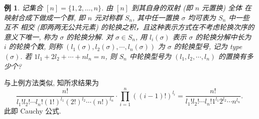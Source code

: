 \documentclass[13pt, punct]{ctexbeamer}
\def\sol{\noindent {\bf 解\ }}
\newtheorem{ex}{例}[section]
\begin{document}
\begin{frame}
	\begin{ex}
		记集合 $[n]=\{1,2, \ldots, n\}$. 由 $[n]$ 到其自身的双射 (即 $n$ 元置换) 全体 在映射合成下做成一个群, 即 $n$ 元对称群 $S_n$, 其中任一置换 $\sigma$ 均可表为 $S_n$ 中一些互不 相交 (即两两无公共元素) 的轮换之积，且这种表示方式在不考虑轮换次序的意义下唯一, 称为 $\sigma$ 的轮换分解. 对 $\sigma \in S_n$, 用 $l_i(\sigma)$ 表示 $\sigma$ 的轮换分解中长为 $i$ 的轮换个数, 则称 $\left(l_1(\sigma), l_2(\sigma), \cdots, l_n(\sigma)\right)$ 为 $\sigma$ 的轮换型号, 记为 type $(\sigma)$. 若 $1 l_1+2 l_2+\cdots+n l_n=n$, 则 $S_n$ 中轮换型号为 $\left(l_1, l_2, \cdots, l_n\right)$ 的置换有多少个?
	\end{ex}
	\pause\sol
与上例方法类似, 知所求结果为
	$$
	\frac{n !}{l_{1} ! l_{2} ! \cdots l_{n} !(1 !)^{l_1}(2 !)^{l_2} \cdots(n !)^{l_n}} \cdot \prod_{i=1}^n((i-1) !)^{l_i}=\frac{n !}{l_{1} ! l_{2} ! \cdots l_{n} ! 1^{l_1} 2^{l_2} \cdots n^{l_n}} .
	$$
	此即 Cauchy 公式.
\end{frame}
\end{document}
